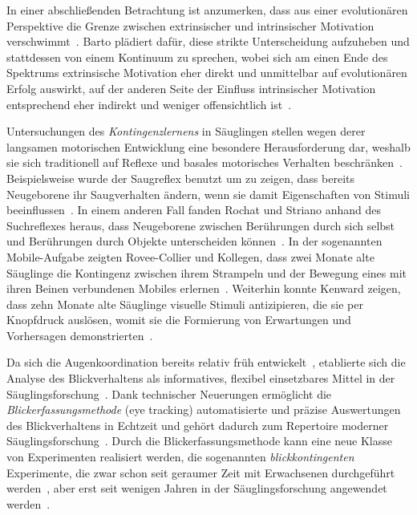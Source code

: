 \documentclass[a4paper]{scrreprt}
\begin{document}
In einer abschlie\ss enden Betrachtung ist anzumerken, dass aus einer evolution\"aren Perspektive die Grenze zwischen extrinsischer und intrinsischer Motivation verschwimmt~\cite{barto13}. Barto pl\"adiert daf\"ur, diese strikte Unterscheidung aufzuheben und stattdessen von einem Kontinuum zu sprechen, wobei sich am einen Ende des Spektrums extrinsische Motivation eher direkt und unmittelbar auf evolution\"aren Erfolg auswirkt, auf der anderen Seite der Einfluss intrinsischer Motivation entsprechend eher indirekt und weniger offensichtlich ist~\cite{barto13}.

\quad

Untersuchungen des \textit{Kontingenzlernens} in S\"auglingen stellen wegen derer langsamen motorischen Entwicklung eine besondere Herausforderung dar, weshalb sie sich traditionell auf Reflexe und basales motorisches Verhalten beschr\"anken~\cite{rovee80,kalnins73}. Beispielsweise wurde der Saugreflex benutzt um zu zeigen, dass bereits Neugeborene ihr Saugverhalten \"andern, wenn sie damit Eigenschaften von Stimuli beeinflussen~\cite{decasper80}. In einem anderen Fall fanden Rochat und Striano anhand des Suchreflexes heraus, dass Neugeborene zwischen Ber\"uhrungen durch sich selbst und Ber\"uhrungen durch Objekte unterscheiden k\"onnen~\cite{rochat00}. In der sogenannten Mobile-Aufgabe zeigten Rovee-Collier und Kollegen, dass zwei Monate alte S\"auglinge die Kontingenz zwischen ihrem Strampeln und der Bewegung eines mit ihren Beinen verbundenen Mobiles erlernen~\cite{rovee80,rovee01}. Weiterhin konnte Kenward zeigen, dass zehn Monate alte S\"auglinge visuelle Stimuli antizipieren, die sie per Knopfdruck ausl\"osen, womit sie die Formierung von Erwartungen und Vorhersagen demonstrierten~\cite{kenward10}.

Da sich die Augenkoordination bereits relativ fr\"uh entwickelt~\cite{bronson90,johnson91}, etablierte sich die Analyse des Blickverhaltens als informatives, flexibel einsetzbares Mittel in der S\"auglingsforschung~\cite{fantz64,cohen72,baillargeon85,haith88,quinn93,csibra99,smith03,mcmurray04,aslin07}. Dank technischer Neuerungen erm\"oglicht die \textit{Blickerfassungsmethode} (eye tracking) automatisierte und pr\"azise Auswertungen des Blickverhaltens in Echtzeit und geh\"ort dadurch zum Repertoire moderner S\"auglingsforschung~\cite{johnson03,mcmurray04,gredebaeck09,oakes12,aslin12}. Durch die Blickerfassungsmethode kann eine neue Klasse von Experimenten realisiert werden, die sogenannten \textit{blickkontingenten} Experimente, die zwar schon seit geraumer Zeit mit Erwachsenen durchgef\"uhrt werden~\cite{reader73,duchowski02}, aber erst seit wenigen Jahren in der S\"auglingsforschung angewendet werden~\cite{holmboe08,deligianna11,wass11,tummeltshammer14,miyazaki14}.
\end{document}
